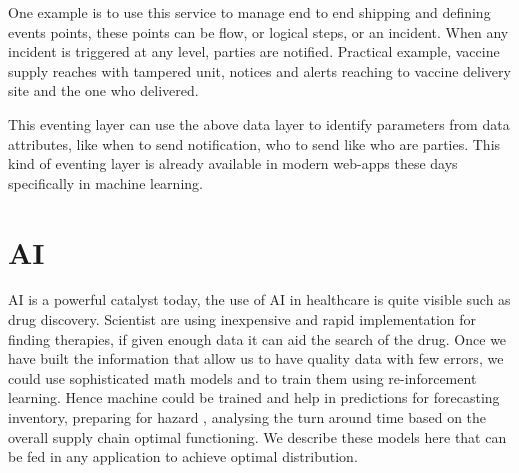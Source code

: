 \documentclass{article}
\begin{document}
One example is to use this service to manage end to end shipping and defining events points, these points can be flow, or logical steps, or an incident. When any incident is triggered at any level, parties are notified. Practical example, vaccine supply reaches with tampered unit, notices and alerts reaching to vaccine delivery site and the one who delivered.

This eventing layer can use the above data layer to identify parameters from data attributes, like when to send notification, who to send like who are parties. This kind of eventing layer is already available in modern web-apps these days specifically in machine learning.

\section{AI}
AI is a powerful catalyst today, the use of AI in healthcare is quite visible such as  drug discovery. Scientist are using inexpensive and rapid implementation for finding therapies, if given enough data it can aid the search of the drug\cite{keshavarzi2020artificial}. Once we have built the information that allow us to have quality data with few errors, we could use sophisticated math models and to train them using re-inforcement learning. Hence machine could be trained and  help in predictions for forecasting inventory, preparing for hazard , analysing the turn around time based on the overall supply chain optimal functioning. We describe these models here that can be fed in any application to achieve optimal distribution.
\end{document}
